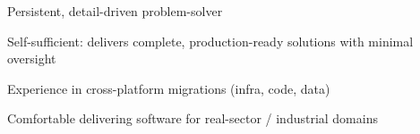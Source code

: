 \documentclass[letter,10pt]{article}
\begin{document}
\begin{zitemize}
        \item Persistent, detail-driven problem-solver
        \item Self-sufficient: delivers complete, production-ready solutions with minimal oversight
        \item Experience in cross-platform migrations (infra, code, data)
        \item Comfortable delivering software for real-sector / industrial domains
\end{zitemize}
\end{document}
